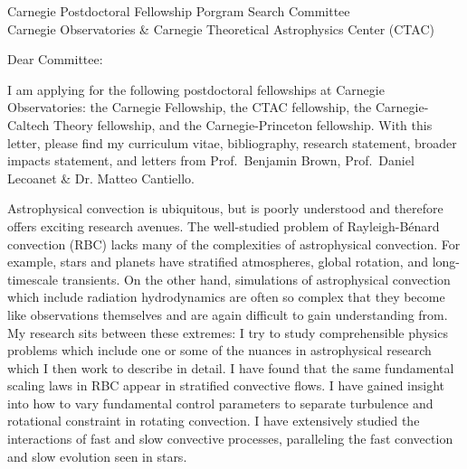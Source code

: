 \documentclass[12pt]{letter}
\begin{document}
\begin{letter}{
               Carnegie Postdoctoral Fellowship Porgram Search Committee \\
               Carnegie Observatories \& Carnegie Theoretical Astrophysics Center (CTAC)
           }

\opening{Dear Committee:}

    I am applying for the following postdoctoral fellowships at Carnegie Observatories: the Carnegie Fellowship, the CTAC fellowship, the Carnegie-Caltech Theory fellowship, and the Carnegie-Princeton fellowship.
    With this letter, please find my curriculum vitae, bibliography, research statement, broader impacts statement, and letters from Prof.~Benjamin Brown, Prof.~Daniel Lecoanet \& Dr. Matteo Cantiello.

    Astrophysical convection is ubiquitous, but is poorly understood and therefore offers exciting research avenues.
    The well-studied problem of Rayleigh-B\'{e}nard convection (RBC) lacks many of the complexities of astrophysical convection.
    For example, stars and planets have stratified atmospheres, global rotation, and long-timescale transients.
    On the other hand, simulations of astrophysical convection which include radiation hydrodynamics are often so complex that they become like observations themselves and are again difficult to gain understanding from.
    My research sits between these extremes: I try to study comprehensible physics problems which include one or some of the nuances in astrophysical research which I then work to describe in detail.
    I have found that the same fundamental scaling laws in RBC appear in stratified convective flows.
    I have gained insight into how to vary fundamental control parameters to separate turbulence and rotational constraint in rotating convection.
    I have extensively studied the interactions of fast and slow convective processes, paralleling the fast convection and slow evolution seen in stars.


\end{letter}
\end{document}
